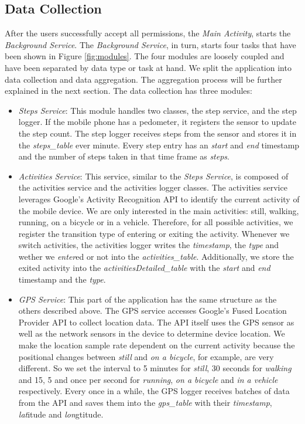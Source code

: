 \subsection{Data Collection}
After the users successfully accept all permissions, the \textit{Main Activity}, starts the \textit{Background Service}. The \textit{Background Service}, in turn, starts four tasks that have been shown in Figure \ref{fig:modules}. The four modules are loosely coupled and have been separated by data type or task at hand. We split the application into data collection and data aggregation. The aggregation process will be further explained in the next section. The data collection has three modules:
\begin{itemize}
    \item \textit{Steps Service}: This module handles two classes, the step service, and the step logger. If the mobile phone has a pedometer, it registers the sensor to update the step count. The step logger receives steps from the sensor and stores it in the \textit{steps\_table} ever minute. Every step entry has an \textit{start} and \textit{end} timestamp and the number of steps taken in that time frame as \textit{steps}.
    \item \textit{Activities Service}: This service, similar to the \textit{Steps Service}, is composed of the activities service and the activities logger classes. The activities service leverages Google's Activity Recognition API to identify the current activity of the mobile device. We are only interested in the main activities: still, walking, running, on a bicycle or in a vehicle. Therefore, for all possible activities, we register the transition type of entering or exiting the activity. Whenever we switch activities, the activities logger writes the \textit{timestamp}, the \textit{type} and wether we \textit{enter}ed or not into the \textit{activities\_table}. Additionally, we store the exited activity into the \textit{activitiesDetailed\_table} with the \textit{start} and \textit{end} timestamp and the \textit{type}.
     \item \textit{GPS Service}: This part of the application has the same structure as the others described above. The GPS service accesses Google's Fused Location Provider API to collect location data. The API itself uses the GPS sensor as well as the network sensors in the device to determine device location. We make the location sample rate dependent on the current activity because the positional changes between \textit{still} and \textit{on a bicycle}, for example, are very different. So we set the interval to 5 minutes for \textit{still}, 30 seconds for \textit{walking} and 15, 5 and once per second for \textit{running}, \textit{on a bicycle} and \textit{in a vehicle} respectively. Every once in a while, the GPS logger receives batches of data from the API and saves them into the \textit{gps\_table} with their  \textit{timestamp}, \textit{lat}itude and \textit{lon}gtitude.
\end{itemize}

